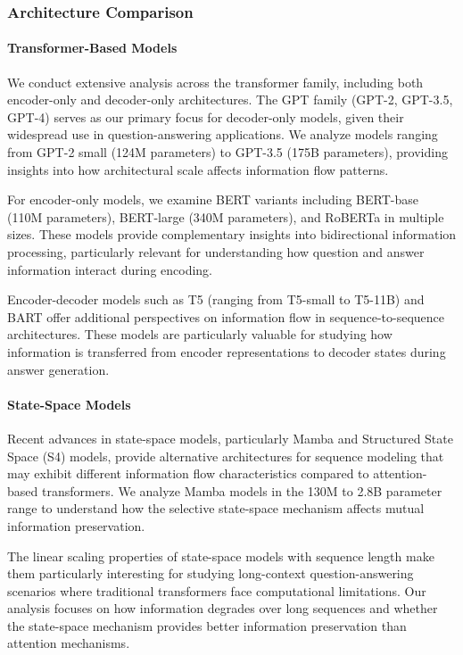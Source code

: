 \subsubsection{Architecture Comparison}

\paragraph{Transformer-Based Models}
We conduct extensive analysis across the transformer family, including both encoder-only and decoder-only architectures. The GPT family (GPT-2, GPT-3.5, GPT-4) serves as our primary focus for decoder-only models, given their widespread use in question-answering applications. We analyze models ranging from GPT-2 small (124M parameters) to GPT-3.5 (175B parameters), providing insights into how architectural scale affects information flow patterns.

For encoder-only models, we examine BERT variants including BERT-base (110M parameters), BERT-large (340M parameters), and RoBERTa in multiple sizes. These models provide complementary insights into bidirectional information processing, particularly relevant for understanding how question and answer information interact during encoding.

Encoder-decoder models such as T5 (ranging from T5-small to T5-11B) and BART offer additional perspectives on information flow in sequence-to-sequence architectures. These models are particularly valuable for studying how information is transferred from encoder representations to decoder states during answer generation.

\paragraph{State-Space Models}
Recent advances in state-space models, particularly Mamba and Structured State Space (S4) models, provide alternative architectures for sequence modeling that may exhibit different information flow characteristics compared to attention-based transformers. We analyze Mamba models in the 130M to 2.8B parameter range to understand how the selective state-space mechanism affects mutual information preservation.

The linear scaling properties of state-space models with sequence length make them particularly interesting for studying long-context question-answering scenarios where traditional transformers face computational limitations. Our analysis focuses on how information degrades over long sequences and whether the state-space mechanism provides better information preservation than attention mechanisms.

